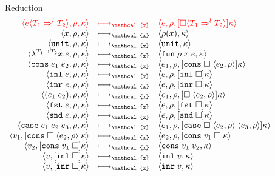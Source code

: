 \documentclass[acmsmall,review,anonymous]{acmart}\settopmatter{printfolios=true,printccs=false,printacmref=false}
\newcommand{\sOOinspect}[3]{\langle#1,#2,#3\rangle}
\newcommand{\sOOreturn}[2]{\langle#1,#2\rangle}
\newcommand{\eOOvar}[1]{#1}
\newcommand{\eOOsole}[0]{\mathtt{unit}}
\newcommand{\eOOlam}[4]{\lambda^{#1\rightarrow{}#2}#3.#4}
\newcommand{\eOOapp}[2]{(#1 \; #2)}
\newcommand{\eOOcons}[2]{\mathtt{cons} \; #1 \; #2}
\newcommand{\eOOcar}[1]{\mathtt{fst} \; #1}
\newcommand{\eOOcdr}[1]{\mathtt{snd} \; #1}
\newcommand{\eOOinl}[1]{\mathtt{inl} \; #1}
\newcommand{\eOOinr}[1]{\mathtt{inr} \; #1}
\newcommand{\eOOcase}[3]{\mathtt{case} \; #1 \; #2 \; #3}
\newcommand{\eOOcast}[4]{#1 \langle \cOOcast{#2}{#3}{#4} \rangle}
\newcommand{\cOOcast}[3]{#1 \Rightarrow^{#2} #3}
\newcommand{\vOOfun}[3]{\mathtt{fun} \; #1 \; #2 \; #3}
\newcommand{\vOOtt}[0]{\mathtt{unit}}
\newcommand{\vOOcons}[2]{\mathtt{cons}\;#1\;#2}
\newcommand{\vOOinl}[1]{\mathtt{inl}\;#1}
\newcommand{\vOOinr}[1]{\mathtt{inr}\;#1}
\newcommand{\kOOconsI}[3]{[\mathtt{cons} \; \square \; \langle#1,#2\rangle ]#3}
\newcommand{\kOOconsII}[2]{[\mathtt{cons} \; #1 \; \square]#2}
\newcommand{\kOOinl}[1]{[\mathtt{inl}\; \square]#1}
\newcommand{\kOOinr}[1]{[\mathtt{inr}\; \square]#1}
\newcommand{\kOOappI}[3]{
  [\square \; \langle#1,#2\rangle]#3
}
\newcommand{\kOOcar}[1]{[\mathtt{fst} \; \square]#1}
\newcommand{\kOOcdr}[1]{[\mathtt{snd} \; \square]#1}
\newcommand{\kOOcaseI}[4]{
  [\mathtt{case} \; \square \; \langle#1,#3\rangle \; \langle#2,#3\rangle ]#4}
\newcommand{\kOOcast}[2]{
  [\square \langle #1 \rangle]#2}
\newcommand{\judgeCreduce}[2]{#1 \longmapsto_{\mathcal{x}} #2}
\newcommand{\redrule}[3]{#1 & \longmapsto_\mathcal{x} & #2 & #3\\}
\newcommand{\hiredrule}[3]{\highlight{#1} & \highlight{\longmapsto_\mathcal{x}} 
& \highlight{#2} & \highlight{#3} \\}
\newcommand{\highlight}[1]{{\color{red} #1}}
\begin{document}
\begin{figure}
  
  \[
  \begin{array}{rclr}
  \end{array}
  \]
  
  Reduction \fbox{$\judgeCreduce{s}{s}$}
  \[
  \begin{array}{rclr}
    \hiredrule{
    \sOOinspect{\eOOcast{e}{T_1}{l}{T_2}}{\rho}{\kappa}
  }{
    \sOOinspect{e}{\rho}{
      \kOOcast{\cOOcast{T_1}{l}{T_2}}{\kappa}
    }
  }{}
  \redrule{
    \sOOinspect{\eOOvar{x}}{\rho}{\kappa}
  }{  
    \sOOreturn{\rho(x)}{\kappa}
  }{}
  \redrule{
    \sOOinspect{\eOOsole}{\rho}{\kappa}
  }{
    \sOOreturn{\vOOtt}{\kappa}
  }{}
  \redrule{
    \sOOinspect{\eOOlam{T_1}{T_2}{x}{e}}{\rho}{\kappa}
  }{
    \sOOreturn{\vOOfun{\rho}{x}{e}}{\kappa}
  }{}
  \redrule{
    \sOOinspect{\eOOcons{e_1}{e_2}}{\rho}{\kappa}
  }{
    \sOOinspect{e_1}{\rho}{\kOOconsI{e_2}{\rho}{\kappa}}
  }{}
  \redrule{
    \sOOinspect{\eOOinl{e}}{\rho}{\kappa}
  }{
    \sOOinspect{e}{\rho}{\kOOinl{\kappa}}
  }{}
  \redrule{
  \sOOinspect{\eOOinr{e}}{\rho}{\kappa}
  }{
  \sOOinspect{e}{\rho}{\kOOinr{\kappa}}
  }{}
  \redrule{
    \sOOinspect{\eOOapp{e_1}{e_2}}{\rho}{\kappa}
  }{
\sOOinspect{e_1}{\rho}{\kOOappI{e_2}{\rho}{\kappa}}}{}

\redrule{
\sOOinspect{\eOOcar{e}}{\rho}{\kappa}}{
\sOOinspect{e}{\rho}{\kOOcar{\kappa}}}{}

\redrule{
  \sOOinspect{\eOOcdr{e}}{\rho}{\kappa}}{
  \sOOinspect{e}{\rho}{\kOOcdr{\kappa}}}{}

\redrule{
\sOOinspect{\eOOcase{e_1}{e_2}{e_3}}{\rho}{\kappa}}{
\sOOinspect{e_1}{\rho}{\kOOcaseI{e_2}{e_3}{\rho}{\kappa}}}{}

\redrule{
\sOOreturn{v_1}{\kOOconsI{e_2}{\rho}{\kappa}}}{
\sOOinspect{e_2}{\rho}{\kOOconsII{v_1}{\kappa}}}{}

\redrule{
\sOOreturn{v_2}{\kOOconsII{v_1}{\kappa}}}{
\sOOreturn{\vOOcons{v_1}{v_2}}{\kappa}}{}

\redrule{
\sOOreturn{v}{\kOOinl{\kappa}}}{
\sOOreturn{\vOOinl{v}}{\kappa}}{}

\redrule{
\sOOreturn{v}{\kOOinr{\kappa}}}{
\sOOreturn{\vOOinr{v}}{\kappa}}{}


\end{array}\]
\end{figure}
\end{document}
